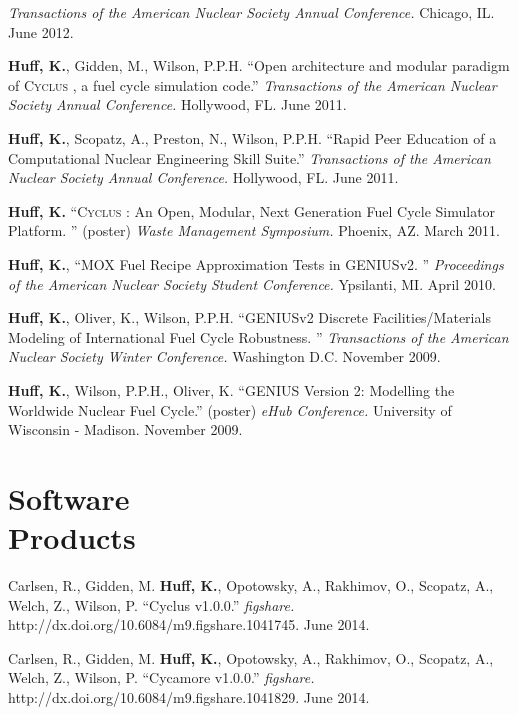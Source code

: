 \documentclass[margin,line]{resume}
\newcommand{\Cyclus}{\textsc{Cyclus }}
\begin{document}
\begin{resume}
\begin{bibenum}
         \emph{Transactions of the American Nuclear Society Annual Conference.} 
        Chicago, IL. June 2012.
      \item \textbf{Huff, K.}, Gidden, M., Wilson, P.P.H. ``Open architecture and modular paradigm of \Cyclus, a fuel cycle simulation code.''
         \emph{Transactions of the American Nuclear Society Annual Conference.} 
        Hollywood, FL. June 2011.
      \item \textbf{Huff, K.}, Scopatz, A., Preston, N., Wilson, P.P.H. ``Rapid Peer Education of a Computational Nuclear Engineering Skill Suite.'' 
         \emph{Transactions of the American Nuclear Society Annual Conference.} 
        Hollywood, FL. June 2011.
      \item \textbf{Huff, K.} ``\Cyclus: An Open, Modular, Next Generation Fuel Cycle Simulator Platform. ''
        (poster)  \emph{Waste Management Symposium.} Phoenix, AZ. March 
        2011.
      \pagebreak
      \item \textbf{Huff, K.}, ``MOX Fuel Recipe Approximation Tests in GENIUSv2. ''
         \emph{Proceedings of the American Nuclear Society Student Conference.} 
        Ypsilanti, MI. April 2010.
      \item \textbf{Huff, K.}, Oliver, K., Wilson, P.P.H. ``GENIUSv2 Discrete Facilities/Materials Modeling of International 
        Fuel Cycle Robustness. ''
         \emph{Transactions of the American Nuclear Society Winter Conference.} 
        Washington D.C. November 2009. 
      \item \textbf{Huff, K.}, Wilson, P.P.H., Oliver, K. ``GENIUS Version 2: Modelling the Worldwide Nuclear Fuel Cycle.'' 
        (poster)  \emph{eHub Conference.} University of Wisconsin - 
        Madison. November 2009.
    \end{bibenum}

    \section{\mysidestyle Software\\Products}
    \begin{bibenum}
      \item Carlsen, R., Gidden, M. \textbf{Huff, K.}, Opotowsky, A., Rakhimov, O., Scopatz, A., Welch, Z., Wilson, P. ``Cyclus v1.0.0.'' \emph{figshare.} 
http://dx.doi.org/10.6084/m9.figshare.1041745. June 2014.
      \item Carlsen, R., Gidden, M. \textbf{Huff, K.}, Opotowsky, A., Rakhimov, O., Scopatz, A., Welch, Z., Wilson, P. ``Cycamore v1.0.0.'' \emph{figshare.} 
http://dx.doi.org/10.6084/m9.figshare.1041829. June 2014.
    \end{bibenum}

\end{resume}
\end{document}
